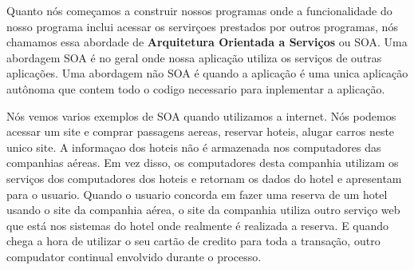 Quanto nós começamos a construir nossos programas onde a funcionalidade
do nosso programa inclui acessar os servirçoes prestados por outros 
programas, nós chamamos essa abordade de {\bf Arquitetura Orientada
a Serviços} ou SOA. Uma abordagem SOA é no geral onde nossa aplicação
utiliza os serviços de outras aplicações. Uma abordagem não SOA é quando
a aplicação é uma unica aplicação autônoma que contem todo o codigo
necessario para inplementar a aplicação.

Nós vemos varios exemplos de SOA quando utilizamos a internet. Nós podemos
acessar um site e comprar passagens aereas, reservar hoteis, alugar carros
neste unico site. A informaçao dos hoteis não é armazenada nos computadores
das companhias aéreas. Em vez disso, os computadores desta companhia utilizam
os serviços dos computadores dos hoteis e retornam os dados do hotel e
apresentam para o usuario. Quando o usuario concorda em fazer uma reserva de
um hotel usando o site da companhia aérea, o site da companhia utiliza outro 
serviço web que está nos sistemas do hotel onde realmente é realizada a reserva.
E quando chega a hora de utilizar o seu cartão de credito para toda a transação,
outro compudator continual envolvido durante o processo.

